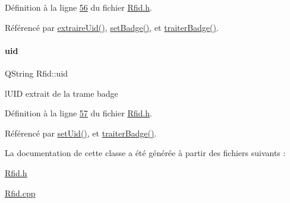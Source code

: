 Définition à la ligne \hyperlink{_rfid_8h_source_l00056}{56} du fichier \hyperlink{_rfid_8h_source}{Rfid.\+h}.



Référencé par \hyperlink{_rfid_8cpp_source_l00130}{extraire\+Uid()}, \hyperlink{_rfid_8cpp_source_l00075}{set\+Badge()}, et \hyperlink{_rfid_8cpp_source_l00097}{traiter\+Badge()}.

\mbox{\label{class_rfid_a157b71d282a7e067c65b431dbae6c6c8}} 
\paragraph{\texorpdfstring{uid}{uid}}
{\footnotesize\ttfamily Q\+String Rfid\+::uid\hspace{0.3cm}{\ttfamily [private]}}



l\textquotesingle{}U\+ID extrait de la trame badge 



Définition à la ligne \hyperlink{_rfid_8h_source_l00057}{57} du fichier \hyperlink{_rfid_8h_source}{Rfid.\+h}.



Référencé par \hyperlink{_rfid_8cpp_source_l00086}{set\+Uid()}, et \hyperlink{_rfid_8cpp_source_l00097}{traiter\+Badge()}.



La documentation de cette classe a été générée à partir des fichiers suivants \+:\begin{DoxyCompactItemize}
\item 
\hyperlink{_rfid_8h}{Rfid.\+h}\item 
\hyperlink{_rfid_8cpp}{Rfid.\+cpp}\end{DoxyCompactItemize}

